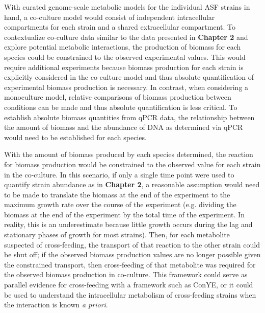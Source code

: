 \documentclass[11pt,onecolumn,notitlepage,openany,twoside]{book}
\begin{document}
\begin{refsection}
With curated genome-scale metabolic models for the individual ASF strains in hand, a co-culture model would consist of independent intracellular compartments for each strain and a shared extracellular compartment. To contextualize co-culture data similar to the data presented in \textbf{Chapter 2} and explore potential metabolic interactions, the production of biomass for each species could be constrained to the observed experimental values. This would require additional experiments because biomass production for each strain is explicitly considered in the co-culture model and thus absolute quantification of experimental biomass production is necessary. In contrast, when considering a monoculture model, relative comparisons of biomass production between conditions can be made and thus absolute quantification is less critical. To establish absolute biomass quantities from qPCR data, the relationship between the amount of biomass and the abundance of DNA as determined via qPCR would need to be established for each species.

With the amount of biomass produced by each species determined, the reaction for biomass production would be constrained to the observed value for each strain in the co-culture. In this scenario, if only a single time point were used to quantify strain abundance as in \textbf{Chapter 2}, a reasonable assumption would need to be made to translate the biomass at the end of the experiment to the maximum growth rate over the course of the experiment (e.g. dividing the biomass at the end of the experiment by the total time of the experiment. In reality, this is an underestimate because little growth occurs during the lag and stationary phases of growth for most strains). Then, for each metabolite suspected of cross-feeding, the transport of that reaction to the other strain could be shut off; if the observed biomass production values are no longer possible given the constrained transport, then cross-feeding of that metabolite was required for the observed biomass production in co-culture. This framework could serve as parallel evidence for cross-feeding with a framework such as ConYE, or it could be used to understand the intracellular metabolism of cross-feeding strains when the interaction is known \textit{a priori}.


\end{refsection}
\end{document}
